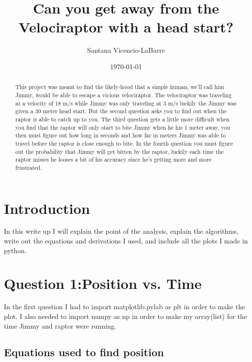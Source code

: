 \documentclass[twocolumn]{revtex4}
\begin{document}
\title{Can you get away from the Velociraptor with a head start?}

\author{Santana Vicencio-LaBarre}
\date{\today}

\begin{abstract}
This project was meant to find the likely-hood that a simple human, we'll call him Jimmy, would be able to escape a vicious velociraptor. The velociraptor was traveling at a velocity of 18 m/s while Jimmy was only traveling at 3 m/s luckily the Jimmy was given a 30 meter head start. But the second question asks you to find out when the raptor is able to catch up to you. The third question gets a little more difficult when you find that the raptor will only start to bite Jimmy when he his 1 meter away, you then must figure out how long in seconds and how far in meters Jimmy was able to travel before the raptor is close enough to bite. In the fourth question you must figure out the probability that Jimmy will get bitten by the raptor, luckily each time the raptor misses he looses a bit of his accuracy since he's getting more and more frustrated. 


\end{abstract}


\maketitle

\section{Introduction}

In this write up I will explain the point of the analysis, explain the algorithms, write out the equations and derivations I used, and include all the plots I made in python. 


\section{Question 1:Position vs. Time} 
In the first question I had to import matplotlib.pylab as plt in order to make the plot. I also needed to import numpy as np in order to make my array(list) for the time Jimmy and raptor were running. 

\subsection{Equations used to find position}
\end{document}
